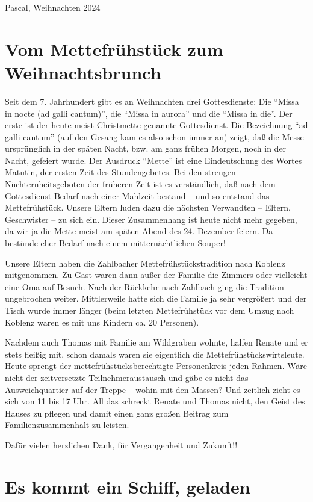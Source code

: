 \documentclass[11pt]{article}
\begin{document}
Pascal, Weihnachten 2024

\section*{Vom Mettefrühstück zum Weihnachtsbrunch}

Seit dem 7. Jahrhundert gibt es an Weihnachten drei Gottesdienste:
Die ``Missa in nocte (ad galli cantum)'', die ``Missa in aurora'' und die ``Missa in die''.
Der erste ist der heute meist Christmette genannte Gottesdienst.
Die Bezeichnung ``ad galli cantum'' (auf den Gesang kam es also schon immer an) zeigt,
daß die Messe ursprünglich in der späten Nacht, bzw. am ganz frühen Morgen, noch in der Nacht, gefeiert wurde.
Der Ausdruck ``Mette'' ist eine Eindeutschung des Wortes Matutin, der ersten Zeit des Stundengebetes.
Bei den strengen Nüchternheitsgeboten der früheren Zeit ist es verständlich,
daß nach dem Gottesdienst Bedarf nach einer Mahlzeit bestand -- und so entstand das Mettefrühstück.
Unsere Eltern luden dazu die nächsten Verwandten -- Eltern, Geschwister -- zu sich ein.
Dieser Zusammenhang ist heute nicht mehr gegeben, da wir ja die Mette meist am späten Abend des 24. Dezember feiern.
Da bestünde eher Bedarf nach einem mitternächtlichen Souper!

Unsere Eltern haben die Zahlbacher Mettefrühstückstradition nach Koblenz mitgenommen.
Zu Gast waren dann außer der Familie die Zimmers oder vielleicht eine Oma auf Besuch.
Nach der Rückkehr nach Zahlbach ging die Tradition ungebrochen weiter.
Mittlerweile hatte sich die Familie ja sehr vergrößert und der Tisch wurde immer länger
(beim letzten Mettefrühstück vor dem Umzug nach Koblenz waren es mit uns Kindern ca. 20 Personen).

Nachdem auch Thomas mit Familie am Wildgraben wohnte, halfen Renate und er stets fleißig mit,
schon damals waren sie eigentlich die Mettefrühstückswirtsleute.
Heute sprengt der mettefrühstücksberechtigte Personenkreis jeden Rahmen.
Wäre nicht der zeitversetzte Teilnehmeraustausch und gäbe es nicht das Ausweichquartier auf der Treppe -- wohin mit den Massen?
Und zeitlich zieht es sich von 11 bis 17 Uhr.
All das schreckt Renate und Thomas nicht, den Geist des Hauses zu pflegen
und damit einen ganz großen Beitrag zum Familienzusammenhalt zu leisten.

Dafür vielen herzlichen Dank, für Vergangenheit und Zukunft!!


\section{Es kommt ein Schiff, geladen}
\end{document}
